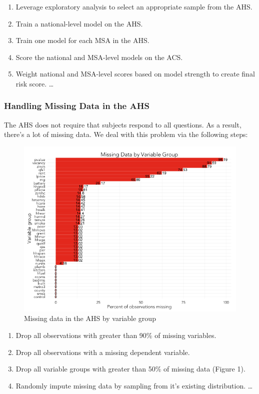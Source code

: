 \documentclass{sig-alternate}
\begin{document}
\begin{enumerate} 
\item Leverage exploratory analysis to select an appropriate sample from the AHS.
\item Train a national-level model on the AHS.
\item Train one model for each MSA in the AHS.
\item Score the national and MSA-level models on the ACS.
\item Weight national and MSA-level scores based on model strength to create final risk score.
\ldots 
\end{enumerate}

\subsubsection{Handling Missing Data in the AHS}

The AHS does not require that subjects respond to all questions. As a result, there's a lot of missing data. We deal with this problem via the following steps:

\begin{figure}
\centering 
\includegraphics[scale=0.42]{missing-data-1.png}
\caption{Missing data in the AHS by variable group}
\end{figure}

\begin{enumerate} 
\item Drop all observations with greater than 90\% of missing variables. 
\item Drop all observations with a missing dependent variable.
\item Drop all variable groups with greater than 50\% of missing data (Figure 1).
\item Randomly impute missing data by sampling from it's existing distribution.
\ldots 
\end{enumerate}
\end{document}
